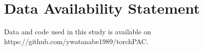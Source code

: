 \section*{Data Availability Statement}
Data and code used in this study is available on https://github.com/ywatanabe1989/torchPAC.

\label{data and code availability}
